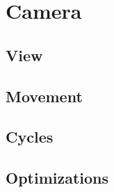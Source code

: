 \chapter{Camera}
\label{chap:camera}

\section{View}
\label{sec:camera-view}


\section{Movement}
\label{sec:camera-movement}


\section{Cycles}
\label{sec:camera-cycles}


\section{Optimizations}
\label{sec:camera-optimization}

